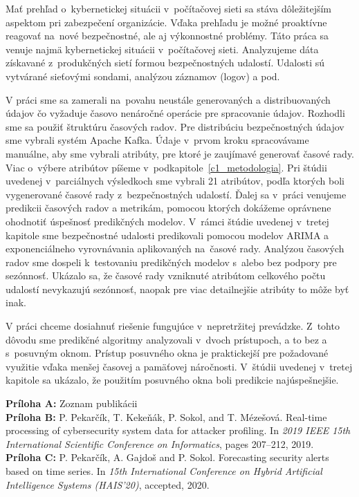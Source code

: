 \documentclass[thesismargins, thesislinespacing, openright, upjsfrontpage]{rnthesis}
\begin{document}

\zaver

Mať prehľad o~kybernetickej situácii v~počítačovej sieti sa stáva dôležitejším aspektom pri zabezpečení organizácie. Vďaka prehľadu je možné proaktívne reagovať na~nové bezpečnostné, ale aj výkonnostné problémy. Táto práca sa venuje najmä kybernetickej situácii v~počítačovej sieti. Analyzujeme dáta získavané z~produkčných sietí formou bezpečnostných udalostí. Udalosti sú vytvárané sieťovými sondami, analýzou záznamov (logov) a pod. 

V práci sme sa zamerali na~povahu neustále generovaných a distribuovaných údajov čo vyžaduje časovo nenáročné operácie pre spracovanie údajov. Rozhodli sme sa použiť štruktúru časových radov. Pre distribúciu bezpečnostných údajov sme vybrali systém Apache Kafka. Údaje v~prvom kroku spracovávame manuálne, aby sme vybrali atribúty, pre ktoré je zaujímavé generovať časové rady. Viac o~výbere atribútov píšeme v~podkapitole~\ref{c1_metodologia}. Pri štúdii uvedenej v~parciálnych výsledkoch sme vybrali 21 atribútov, podľa ktorých boli vygenerované časové rady z~bezpečnostných udalostí. Ďalej sa v~práci venujeme predikcii časových radov a metrikám, pomocou ktorých dokážeme oprávnene ohodnotiť úspešnosť predikčných modelov. V~rámci štúdie uvedenej v~tretej kapitole sme bezpečnostné udalosti predikovali pomocou modelov ARIMA a exponenciálneho vyrovnávania aplikovaných na~časové rady. Analýzou časových radov sme dospeli k~testovaniu predikčných modelov s~alebo bez podpory pre sezónnosť. Ukázalo sa, že časové rady vzniknuté atribútom celkového počtu udalostí nevykazujú sezónnosť, naopak pre viac detailnejšie atribúty to môže byť inak.

V práci chceme dosiahnuť riešenie fungujúce v~nepretržitej prevádzke. Z~tohto dôvodu sme predikčné algoritmy analyzovali v~dvoch prístupoch, a to bez a s~posuvným oknom. Prístup posuvného okna je praktickejší pre požadované využitie vďaka menšej časovej a pamäťovej náročnosti. V~štúdii uvedenej v~tretej kapitole sa ukázalo, že použitím posuvného okna boli predikcie najúspešnejšie.

%
%
\prilohy

\textbf{Príloha A:} Zoznam publikácii \\
\textbf{Príloha B:} P. Pekarčík, T. Kekeňák, P. Sokol, and T. Mézešová. Real-time processing of cybersecurity system data for attacker profiling. In \textit{2019 IEEE 15th International Scientific Conference on Informatics}, pages 207–212, 2019. \\
\textbf{Príloha C:} P. Pekarčík, A. Gajdoš and P. Sokol. Forecasting security alerts based on time series. In \textit{15th International Conference on Hybrid Artificial Intelligence Systems (HAIS’20)}, accepted, 2020.
\end{document}
